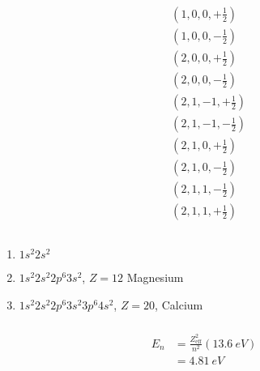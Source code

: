 \documentclass{article}
\begin{document}
\subsubsection{}

\begin{align*}
   & \left( 1, 0, 0, +\frac{1}{2} \right)  \\
   & \left( 1, 0, 0, -\frac{1}{2} \right)  \\
   & \left( 2, 0, 0, +\frac{1}{2} \right)  \\
   & \left( 2, 0, 0, -\frac{1}{2} \right)  \\
   & \left( 2, 1, -1, +\frac{1}{2} \right) \\
   & \left( 2, 1, -1, -\frac{1}{2} \right) \\
   & \left( 2, 1, 0, +\frac{1}{2} \right)  \\
   & \left( 2, 1, 0, -\frac{1}{2} \right)  \\
   & \left( 2, 1, 1, -\frac{1}{2} \right)  \\
   & \left( 2, 1, 1, +\frac{1}{2} \right)  \\
\end{align*}

\setcounter{subsubsection}{28}
\subsubsection{}

\begin{enumerate}
  \item $1 s^2 2 s^2$

  \item $1 s^2 2 s^2 2 p^6 3 s^2$, $Z = 12$ Magnesium

  \item $1 s^2 2 s^2 2 p^6 3 s^2 3 p^6 4 s^2$, $Z = 20$, Calcium
\end{enumerate}

\setcounter{subsubsection}{30}
\subsubsection{}

\begin{align*}
  E_n & = \frac{Z_\text{eff}^2}{n^2} (\qty{13.6}{eV}) \\
      & = \qty{4.81}{eV}
\end{align*}

\setcounter{subsubsection}{32}
\subsubsection{}
\end{document}
